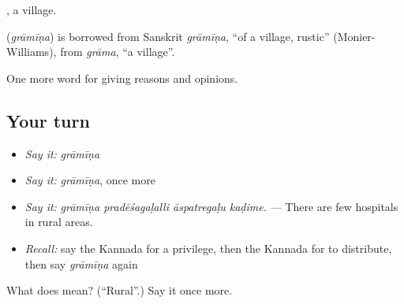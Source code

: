 , a village.

\begin{cousinweb}
\textbf{} (\emph{grāmīṇa}) is borrowed from Sanskrit \emph{grāmīṇa}, \textquotedblleft{}of a village, rustic\textquotedblright{} (Monier-Williams), from \emph{grāma}, \textquotedblleft{}a village\textquotedblright{}.
\end{cousinweb}

\begin{grammarlens}[title={What you've built}]
One more word for giving reasons and opinions.
\end{grammarlens}

\subsection*{Your turn}
\begin{itemize}
\raggedright
  \item \emph{Say it:} \emph{grāmīṇa}
  \item \emph{Say it:} \emph{grāmīṇa}, once more
  \item \emph{Say it:} \emph{grāmīṇa pradēśagaḷalli āspatregaḷu kaḍime.} — There are few hospitals in rural areas.
  \item \emph{Recall:} say the Kannada for a privilege, then the Kannada for to distribute, then say \emph{grāmīṇa} again
\end{itemize}

\begin{tcolorbox}[breakable,colback=teal!4,colframe=teal!35!black,title={Before you move on}]
What does  mean? (\textquotedblleft{}Rural\textquotedblright{}.) Say it once more.
\end{tcolorbox}
